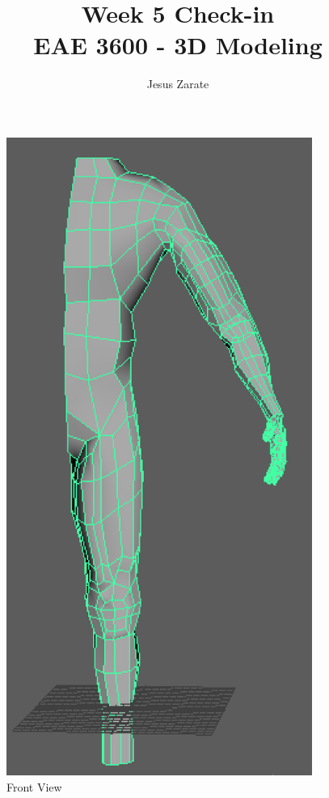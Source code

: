 \documentclass[a4paper]{article}
\title{
  Week 5 Check-in\\
  \large EAE 3600 - 3D Modeling}
\author{Jesus Zarate}
\begin{document}
\maketitle


\begin{figure}[h]
\centering
\includegraphics[width=10cm]{img/Front.png}
\caption{Front View}
\label{fig:Front View}
\end{figure}
\end{document}
